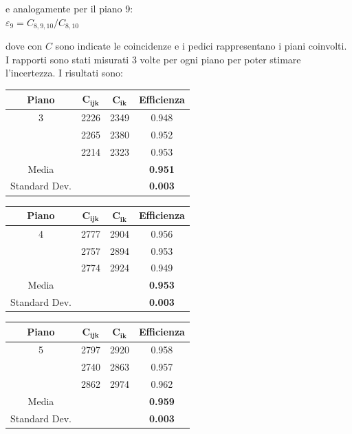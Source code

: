 \documentclass[11pt]{article}
\begin{document}
\begin{flushleft}
e analogamente per il piano 9: \\

$
\varepsilon_9 = C_{8,9,10}/C_{8,10}
$

dove con $C$ sono indicate le coincidenze e i pedici rappresentano i piani coinvolti. I
rapporti sono stati misurati 3 volte per ogni piano per poter stimare l'incertezza. I risultati sono: \\
\vspace{1 cm}

\begin{tabular}{|c|c|c|c|}
\hline 
\textbf{Piano} & $\mathbf{C_{ijk}}$ & $\mathbf{C_{ik}}$ & \textbf{Efficienza} \\ 
\hline 
3 & 2226 & 2349 & 0.948 \\ 
\hline 
\hphantom & 2265 & 2380 & 0.952 \\ 
\hline 
\hphantom & 2214 & 2323 & 0.953 \\ 
\hline 
Media & \hphantom & \hphantom & \textbf{0.951} \\ 
\hline 
Standard Dev. & \hphantom & \hphantom & \textbf{0.003} \\ 
\hline 
\end{tabular} 

\begin{tabular}{|c|c|c|c|}
\hline 
\textbf{Piano} & $\mathbf{C_{ijk}}$ & $\mathbf{C_{ik}}$ & \textbf{Efficienza} \\
\hline 
4 & 2777 & 2904 & 0.956 \\ 
\hline 
\hphantom & 2757 & 2894 & 0.953 \\ 
\hline 
\hphantom & 2774 & 2924 & 0.949 \\ 
\hline 
Media & \hphantom & \hphantom & \textbf{0.953} \\ 
\hline 
Standard Dev. & \hphantom & \hphantom & \textbf{0.003} \\ 
\hline 
\end{tabular} 

\begin{tabular}{|c|c|c|c|}
\hline 
\textbf{Piano} & $\mathbf{C_{ijk}}$ & $\mathbf{C_{ik}}$ & \textbf{Efficienza} \\
\hline 
5 & 2797 & 2920 & 0.958 \\ 
\hline 
\hphantom & 2740 & 2863 & 0.957 \\ 
\hline 
\hphantom & 2862 & 2974 & 0.962 \\ 
\hline 
Media & \hphantom & \hphantom & \textbf{0.959} \\ 
\hline 
Standard Dev. & \hphantom & \hphantom & \textbf{0.003} \\ 
\hline 
\end{tabular} 
\vspace{0.8 cm}


\end{flushleft}
\end{document}
